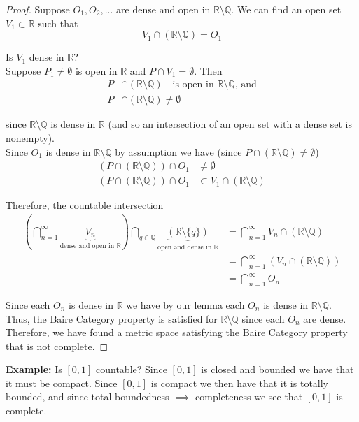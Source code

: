 \documentclass[12pt]{article}
\newlength\tindent
\renewcommand{\indent}{\hspace*{\tindent}}
\newcommand{\R}{\mathbb R}
\newcommand{\Q}{\mathbb Q}
\begin{document}
\begin{proof} Suppose $O_1, O_2, ...$ are dense and open in $\R\setminus\Q$. We can find an open set $V_1 \subset \R$ such that
\begin{equation*}
	V_1 \cap \left( \R \setminus \Q \right) = O_1
\end{equation*}

Is $V_1$ dense in $\R$? \\

Suppose $P_1 \neq \emptyset$ is open in $\R$ and $P \cap V_1 = \emptyset$. Then
\begin{align*}
	P &\cap \left( \R\setminus\Q \right) \quad \text{is open in $\R\setminus\Q$, and} \\
	P &\cap \left( \R\setminus\Q \right) \neq \emptyset
\end{align*}

since $\R\setminus\Q$ is dense in $\R$ (and so an intersection of an open set with a dense set is nonempty). \\

Since $O_1$ is dense in $\R\setminus\Q$ by assumption we have (since $P \cap \left( \R\setminus\Q \right) \neq \emptyset$)
\begin{align*}
	\left( P \cap \left( \R\setminus\Q \right) \right) \cap O_1 &\neq \emptyset \\
	\left( P \cap \left( \R\setminus\Q \right)\right) \cap O_1 &\subset V_1 \cap \left( \R\setminus\Q \right)
\end{align*}

Therefore, the countable intersection
\begin{align*}
	\left( \bigcap^\infty_{n = 1} \underbrace{V_n}_{\text{dense and open in $\R$}} \right) \bigcap_{q\in\Q} \underbrace{\left(\R\setminus\{q\}\right)}_{\text{open and dense in $\R$}} &= \bigcap^\infty_{n = 1} V_n \cap \left( \R\setminus\Q \right) \\
	&= \bigcap^\infty_{n = 1} \left( V_n \cap \left(\R\setminus\Q\right)\right) \\
	&= \bigcap^\infty_{n = 1} O_n
\end{align*}

\indent Since each $O_n$ is dense in $\R$ we have by our lemma each $O_n$ is dense in $\R\setminus\Q$. Thus, the Baire Category property is satisfied for $\R\setminus\Q$ since each $O_n$ are dense. Therefore, we have found a metric space satisfying the Baire Category property that is not complete.
\end{proof}

%
%
{\bf Example:} Is $[0,1]$ countable? Since $[0,1]$ is closed and bounded we have that it must be compact. Since $[0,1]$ is compact we then have that it is totally bounded, and since total boundedness $\implies$ completeness we see that $[0,1]$ is complete. \\
\end{document}
